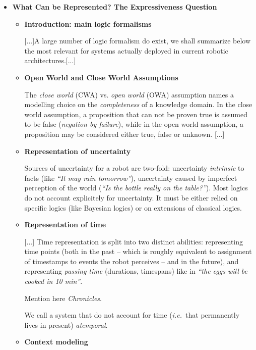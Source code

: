 \documentclass[a4paper]{article}
\newcommand{\ie}{{\textit{i.e.~}}}
\begin{document}
\begin{itemize}
    \item{\bf What Can be Represented? The Expressiveness Question}

    \begin{itemize}
        \item{\bf Introduction: main logic formalisms}

    [...]A large number of logic formalism do exist, we shall summarize below the most
    relevant for systems actually deployed in current robotic architectures.[...]

        \item{\bf Open World and Close World Assumptions}

    The \emph{close world} (CWA) vs. \emph{open world} (OWA) assumption names a
    modelling choice on the \emph{completeness} of a knowledge domain. In the close
    world assumption, a proposition that can not be proven true is assumed to be
    false (\emph{negation by failure}), while in the open world assumption, a
    proposition may be considered either true, false or unknown. [...]

        \item{\bf Representation of uncertainty}
        
	Sources of uncertainty for a robot are two-fold: uncertainty
	\emph{intrinsic} to facts (like \emph{``It may rain tomorrow''}),
	uncertainty caused by imperfect perception of the world (\emph{``Is the
	bottle really on the table?''}). Most logics do not account explicitely for
	uncertainty. It must be either relied on specific logics (like Bayesian
	logics) or on extensions of classical logics.

        \item{\bf Representation of time}

	[...] Time representation is split into two distinct
	abilities: representing time points (both in the past -- which is roughly
	equivalent to assignment of timestamps to events the robot perceives -- and
	in the future), and representing \emph{passing time} (durations, timespans)
	like in \emph{``the eggs will be cooked in 10 min''}.
 
    Mention here \emph{Chronicles}.

	We call a system that do not account for time (\ie that permanently lives
	in present) \emph{atemporal}.

        \item{\bf Context modeling}
	

\end{itemize}
\end{itemize}
\end{document}
